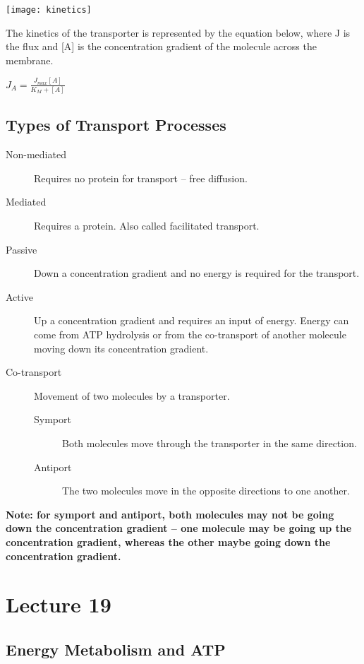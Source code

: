 \documentclass[a4paper, 12pt]{report}
\newcommand{\mychapter}[2]{
    \setcounter{chapter}{#1}
    \setcounter{section}{0}
    \chapter*{#2}
    \addcontentsline{toc}{chapter}{#2}
}
\begin{document}
\begin{center}
\texttt{[image: kinetics]}
\end{center}

The kinetics of the transporter is represented by the equation below, where J is the flux and [A] is the concentration gradient of the molecule across the membrane.

\begin{center}
\large{$J_A = \frac{J_{max}[A]}{K_M + [A]}$}
\end{center}

\section{Types of Transport Processes}

\begin{description}
\item [Non-mediated] Requires no protein for transport -- free diffusion.
\item [Mediated] Requires a protein. Also called facilitated transport.
\item [Passive] Down a concentration gradient and no energy is required for the transport.
\item [Active] Up a concentration gradient and requires an input of energy. Energy can come from ATP hydrolysis or from the co-transport of another molecule moving down its concentration gradient.
\item [Co-transport] Movement of two molecules by a transporter.
\begin{description}
\item [Symport] Both molecules move through the transporter in the same direction.
\item [Antiport] The two molecules move in the opposite directions to one another.
\end{description}
\end{description}

\vspace{0.5cm}

\noindent
\textbf{Note: for symport and antiport, both molecules may not be going down the concentration gradient -- one molecule may be going up the concentration gradient, whereas the other maybe going down the concentration gradient.}

\mychapter{19}{Lecture 19}

\section{Energy Metabolism and ATP}
\end{document}
